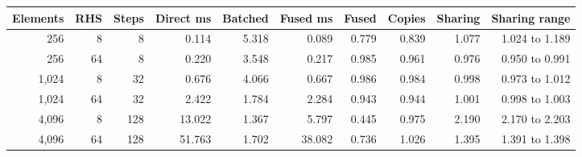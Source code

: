 \begin{tabular}{rrrrrrrrrr}
\toprule
Elements & RHS & Steps & Direct ms & Batched & Fused ms & Fused & Copies & Sharing & Sharing range\\
\midrule
256 & 8 & 8 & 0.114 & 5.318 & 0.089 & 0.779 & 0.839 & 1.077 & 1.024 to 1.189\\
256 & 64 & 8 & 0.220 & 3.548 & 0.217 & 0.985 & 0.961 & 0.976 & 0.950 to 0.991\\
1,024 & 8 & 32 & 0.676 & 4.066 & 0.667 & 0.986 & 0.984 & 0.998 & 0.973 to 1.012\\
1,024 & 64 & 32 & 2.422 & 1.784 & 2.284 & 0.943 & 0.944 & 1.001 & 0.998 to 1.003\\
4,096 & 8 & 128 & 13.022 & 1.367 & 5.797 & 0.445 & 0.975 & 2.190 & 2.170 to 2.203\\
4,096 & 64 & 128 & 51.763 & 1.702 & 38.082 & 0.736 & 1.026 & 1.395 & 1.391 to 1.398\\
\bottomrule
\end{tabular}
